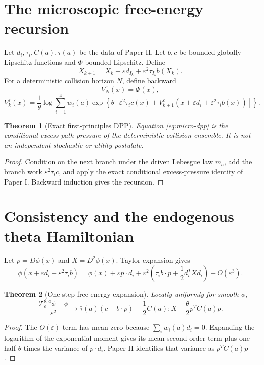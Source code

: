 \documentclass[11pt,reqno]{amsart}
\newtheorem{theorem}{Theorem}[section]
\theoremstyle{remark}
\begin{document}
\section{The microscopic free-energy recursion}
Let $d_i,\tau_i,C(a),\bar\tau(a)$ be the data of Paper II.  Let $b,c$ be
bounded globally Lipschitz functions and $\Phi$ bounded Lipschitz.  Define
\[
 X_{k+1}=X_k+\varepsilon d_{I_k}
 +\varepsilon^2\tau_{I_k}b(X_k).
\]
For a deterministic collision horizon $N$, define backward
\[
 V_N^\varepsilon(x)=\Phi(x),
\]
\begin{equation}\label{eq:micro-dpp}
 V_k^\varepsilon(x)
 =\frac1\theta\log\sum_{i=1}^4w_i(a)
 \exp\left\{\theta\left[
 \varepsilon^2\tau_i c(x)
 +V_{k+1}^\varepsilon
 (x+\varepsilon d_i+
 \varepsilon^2\tau_i b(x))
 \right]\right\}.
\end{equation}

\begin{theorem}[Exact first-principles DPP]\label{thm:dpp}
Equation \eqref{eq:micro-dpp} is the conditional excess path pressure of the
deterministic collision ensemble.  It is not an independent stochastic or
utility postulate.
\end{theorem}
\begin{proof}
Condition on the next branch under the driven Lebesgue law $m_a$, add the
branch work $\varepsilon^2\tau_i c$, and apply the exact conditional
excess-pressure identity of Paper I.  Backward induction gives the recursion.
\end{proof}

\section{Consistency and the endogenous theta Hamiltonian}
Let $p=D\phi(x)$ and $X=D^2\phi(x)$.  Taylor expansion gives
\[
 \phi(x+\varepsilon d_i+
 \varepsilon^2\tau_ib)
 =\phi(x)+\varepsilon p\cdot d_i
 +\varepsilon^2\left(
 \tau_i b\cdot p+\frac12d_i^TXd_i
 \right)+O(\varepsilon^3).
\]

\begin{theorem}[One-step free-energy expansion]\label{thm:expansion}
Locally uniformly for smooth $\phi$,
\[
 \frac{\mathcal T_\varepsilon^{\theta,a}\phi-\phi}{\varepsilon^2}
 \longrightarrow
 \bar\tau(a)(c+b\cdot p)
 +\frac12C(a):X
 +\frac\theta2p^TC(a)p.
\]
\end{theorem}
\begin{proof}
The $O(\varepsilon)$ term has mean zero because
$\sum_iw_i(a)d_i=0$.  Expanding the logarithm of the exponential moment gives
its mean second-order term plus one half $\theta$ times the variance of
$p\cdot d_i$.  Paper II identifies that variance as $p^TC(a)p$.
\end{proof}
\end{document}

